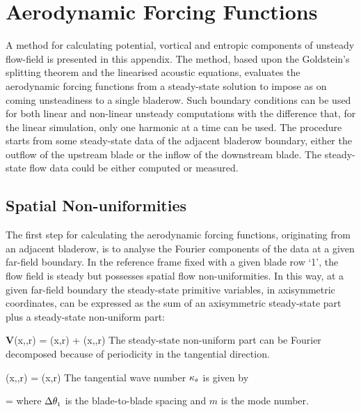 %
%
%
%
%
\chapter{Aerodynamic Forcing Functions}
\label{waves.chap}
\setcounter{footnote}{0}
%
 A method for calculating potential, vortical and entropic
 components of unsteady flow-field is presented in this appendix.
 The method, based upon the Goldstein's splitting theorem and the linearised
 acoustic equations, evaluates the aerodynamic forcing functions
 from a steady-state solution to impose as on coming unsteadiness to a single bladerow.
 Such boundary conditions can be used for both linear and non-linear unsteady
 computations with the difference that, for the linear simulation,
 only one harmonic at a time can be used.
 The procedure starts from some steady-state data of the adjacent bladerow
 boundary, either the outflow of the upstream blade or the inflow of the
 downstream blade. The steady-state flow data could be either computed or measured.
%
%
%
%
\section{Spatial Non-uniformities}
%
 The first step for calculating the aerodynamic forcing functions,
 originating from an adjacent bladerow, is to analyse
 the Fourier components of the data at a given far-field boundary.
 In the reference frame fixed with a given blade row `1',
 the flow field is steady but possesses spatial flow non-uniformities.
 In this way, at a given far-field boundary
 the steady-state primitive variables, in axisymmetric coordinates,
 can be expressed as the sum of an axisymmetric steady-state part plus
 a steady-state non-uniform part:

%
\beq
  {\bf V}\left(x,\theta{},r\right) = \left(x,r\right) +
                                         \left(x,\theta{},r\right)
\eeq
%
 The steady-state non-uniform part can be Fourier decomposed because
 of periodicity in the tangential direction.

%
\beq
  \left(x,\theta{},r\right) =
  \sum {}\left(x,r\right)
  \label{perurbation_variables.eq}
\eeq
%
 The tangential wave number $\kappa_{\mbox{\tiny $\theta$}}$ is given by

%
\beq
  \kappa\sm{\theta} = 
  \label{tangential_wave_number.eq}
\eeq
%
 where $\Delta \theta_{\mbox{\tiny $1$}}$ is the blade-to-blade spacing
 and $m$ is the mode number.

